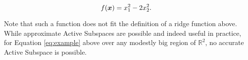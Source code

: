 \documentclass{article}
\begin{document}
\begin{equation}
f(\boldsymbol{x}) = x_1^2 - 2x_2^2. \label{eq:example}
\end{equation}

Note that such a function does not fit the definition of a ridge function above. While approximate Active Subspaces are possible and indeed useful in practice, for Equation \ref{eq:example} above over any modestly big region of $\mathbb{R}^2$, no accurate Active Subspace is possible.




\end{document}
